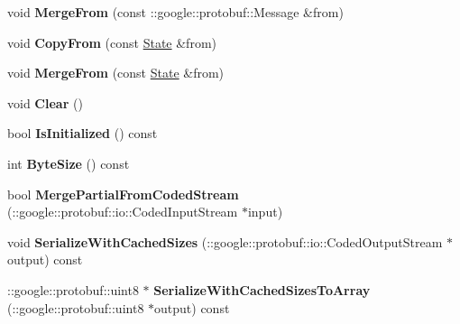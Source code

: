 \begin{DoxyCompactItemize}
\item 
\hypertarget{classgraph_1_1State_a30c21580da4c4a0aabb377ea18faa6ca}{
void {\bfseries MergeFrom} (const ::google::protobuf::Message \&from)}
\label{classgraph_1_1State_a30c21580da4c4a0aabb377ea18faa6ca}

\item 
\hypertarget{classgraph_1_1State_abfbeda00609f734e2bd45532e3b64869}{
void {\bfseries CopyFrom} (const \hyperlink{classgraph_1_1State}{State} \&from)}
\label{classgraph_1_1State_abfbeda00609f734e2bd45532e3b64869}

\item 
\hypertarget{classgraph_1_1State_ab523b1c4f8d71da48e446e3884d6027a}{
void {\bfseries MergeFrom} (const \hyperlink{classgraph_1_1State}{State} \&from)}
\label{classgraph_1_1State_ab523b1c4f8d71da48e446e3884d6027a}

\item 
\hypertarget{classgraph_1_1State_a7e43bad443bae237f2d8f3da129c29b2}{
void {\bfseries Clear} ()}
\label{classgraph_1_1State_a7e43bad443bae237f2d8f3da129c29b2}

\item 
\hypertarget{classgraph_1_1State_ab4efc2c78ba99b00f8fdab324191dc82}{
bool {\bfseries IsInitialized} () const }
\label{classgraph_1_1State_ab4efc2c78ba99b00f8fdab324191dc82}

\item 
\hypertarget{classgraph_1_1State_a22390019514703125f352bad7f38e023}{
int {\bfseries ByteSize} () const }
\label{classgraph_1_1State_a22390019514703125f352bad7f38e023}

\item 
\hypertarget{classgraph_1_1State_a8d96e8a53c415c86a55186c99f6f09e2}{
bool {\bfseries MergePartialFromCodedStream} (::google::protobuf::io::CodedInputStream $\ast$input)}
\label{classgraph_1_1State_a8d96e8a53c415c86a55186c99f6f09e2}

\item 
\hypertarget{classgraph_1_1State_a33dde93606b7e7e3f68f17fa39c9600c}{
void {\bfseries SerializeWithCachedSizes} (::google::protobuf::io::CodedOutputStream $\ast$output) const }
\label{classgraph_1_1State_a33dde93606b7e7e3f68f17fa39c9600c}

\item 
\hypertarget{classgraph_1_1State_a5c2538044c4523a9bdaa9bcdecc66045}{
::google::protobuf::uint8 $\ast$ {\bfseries SerializeWithCachedSizesToArray} (::google::protobuf::uint8 $\ast$output) const }
\label{classgraph_1_1State_a5c2538044c4523a9bdaa9bcdecc66045}


\end{DoxyCompactItemize}
